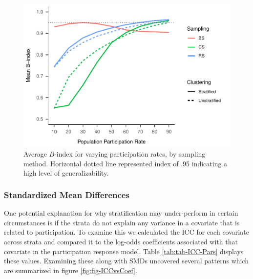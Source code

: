 \documentclass[man,floatsintext]{apa6}
\begin{document}
\begin{figure}
\centering
\includegraphics{GenSamp_Paper_files/figure-latex/fig-avg-Bindex-1.pdf}
\caption{\label{fig:fig-avg-Bindex}Average \(B\)-index for varying participation rates, by sampling method. Horizontal dotted line represented index of .95 indicating a high level of generalizability.}
\end{figure}

\hypertarget{standardized-mean-differences}{%
\subsubsection{Standardized Mean Differences}\label{standardized-mean-differences}}

One potential explanation for why stratification may under-perform in certain circumstances is if the strata do not explain any variance in a covariate that is related to participation. To examine this we calculated the ICC for each covariate across strata and compared it to the log-odds coefficients associated with that covariate in the participation response model. Table \ref{tab:tab-ICC-Pars} displays these values. Examining these along with SMDs uncovered several patterns which are summarized in figure \ref{fig:fig-ICCvsCoef}.
\end{document}
